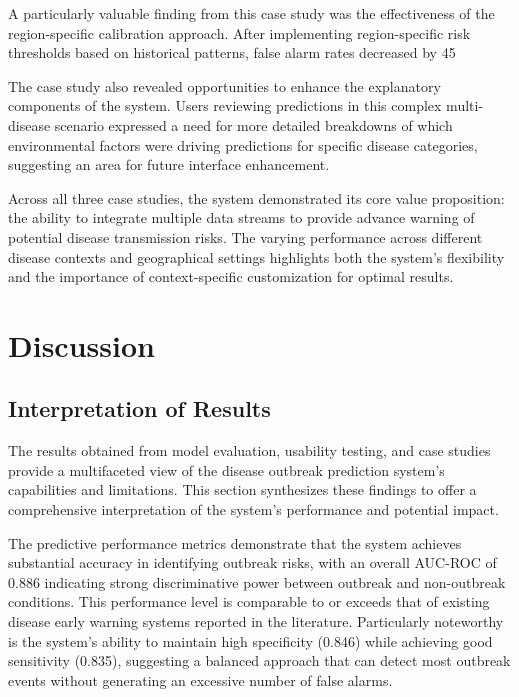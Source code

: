 \documentclass[12pt,a4paper]{report}
\begin{document}
A particularly valuable finding from this case study was the effectiveness of the region-specific calibration approach. After implementing region-specific risk thresholds based on historical patterns, false alarm rates decreased by 45%

The case study also revealed opportunities to enhance the explanatory components of the system. Users reviewing predictions in this complex multi-disease scenario expressed a need for more detailed breakdowns of which environmental factors were driving predictions for specific disease categories, suggesting an area for future interface enhancement.

Across all three case studies, the system demonstrated its core value proposition: the ability to integrate multiple data streams to provide advance warning of potential disease transmission risks. The varying performance across different disease contexts and geographical settings highlights both the system's flexibility and the importance of context-specific customization for optimal results.

\chapter{Discussion}
\section{Interpretation of Results}
The results obtained from model evaluation, usability testing, and case studies provide a multifaceted view of the disease outbreak prediction system's capabilities and limitations. This section synthesizes these findings to offer a comprehensive interpretation of the system's performance and potential impact.

The predictive performance metrics demonstrate that the system achieves substantial accuracy in identifying outbreak risks, with an overall AUC-ROC of 0.886 indicating strong discriminative power between outbreak and non-outbreak conditions. This performance level is comparable to or exceeds that of existing disease early warning systems reported in the literature. Particularly noteworthy is the system's ability to maintain high specificity (0.846) while achieving good sensitivity (0.835), suggesting a balanced approach that can detect most outbreak events without generating an excessive number of false alarms.
\end{document}
